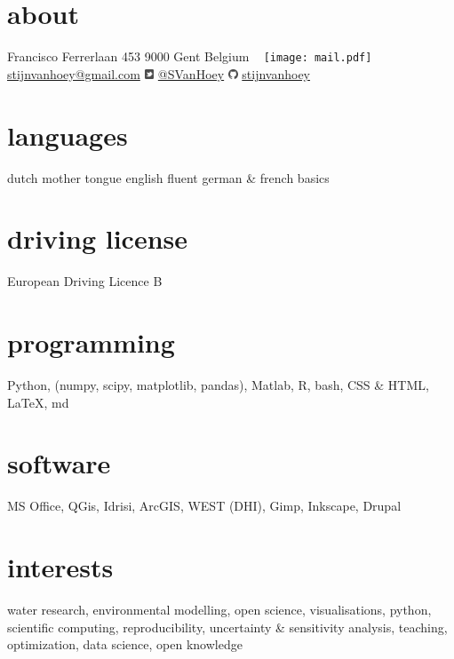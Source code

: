\documentclass[]{stvhoey-cv}  %
\begin{document}
       {}%

\begin{aside}
  \section{about}
    Francisco Ferrerlaan 453
    9000 Gent
    Belgium
    ~
    \texttt{[image: mail.pdf]}   \href{mailto:stijnvanhoey@gmail.com}{stijnvanhoey@gmail.com} 
    	\includegraphics[height=8pt]{twitter.pdf} \href{https://twitter.com/svanhoey}{@SVanHoey}
	\includegraphics[height=8pt]{github.pdf} \href{http://github.com/stijnvanhoey}{stijnvanhoey}%
  \section{languages}
    dutch mother tongue
    english fluent
   german \&  french basics
  \section{driving license}
  European Driving
  Licence B
  \section{programming}
   Python, %
    (numpy, scipy,
    matplotlib, pandas),
    Matlab, R, bash,
    CSS \& HTML,
    \LaTeX, md
  \section{software}
   MS Office,
   QGis, Idrisi, ArcGIS,
   WEST (DHI),
   Gimp, Inkscape,
   Drupal
\end{aside}
   
\section{interests}
water research, environmental modelling, open science, visualisations, python, scientific computing, reproducibility, uncertainty \& sensitivity analysis, teaching, optimization, data science, open knowledge \vspace{\baselineskip}
\end{document}

